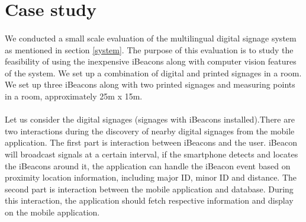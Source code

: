 \documentclass[12pt]{article}
\begin{document}
\section{Case study}
\label{evaluation}

%


\paragraph{}We conducted a small scale evaluation of the multilingual digital signage system as mentioned in section \ref{system}. The purpose of this evaluation is to study the feasibility of using the inexpensive iBeacons along with computer vision features of the system. We set up a combination of digital and printed signages in a room. We set up three iBeacons along with two printed signages and measuring points in a room, approximately 25m x 15m.

\paragraph{}Let us consider the digital signages (signages with iBeacons installed).There are two interactions during the discovery of nearby digital signages from the mobile application. The first part is interaction between iBeacons and the user. iBeacon will broadcast signals at a certain interval, if the smartphone detects and locates the iBeacons around it,  the application can handle the iBeacon event based on proximity location information, including major ID, minor ID and distance. The second part is interaction between the mobile application and database. During this interaction, the application should fetch respective information and display on the mobile application.
\end{document}

